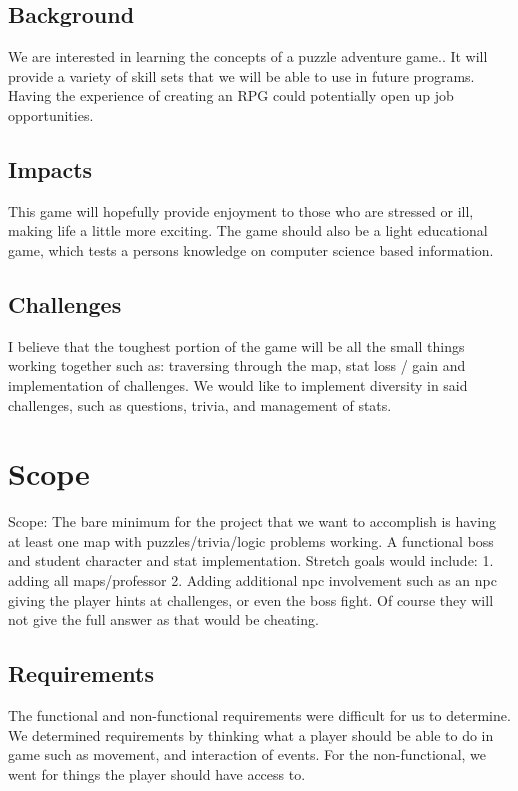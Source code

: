 \documentclass[10pt,conference,onecolumn,compsoc]{IEEEtran}
\begin{document}
\subsection{Background}
We are interested in learning the concepts of a puzzle adventure game.. It will provide a variety of skill sets that we will be able to use in future programs. Having the experience of creating an RPG could potentially open up job opportunities.



\subsection{Impacts}
This game will hopefully provide enjoyment to those who are stressed or ill, making life a little more exciting. The game should also be a light educational game, which tests a persons knowledge on computer science based information.

\subsection{Challenges}
I believe that the toughest portion of the game will be all the small things working together such as: traversing through the map, stat loss / gain and implementation of challenges. We would like to implement diversity in said challenges, such as questions, trivia, and management of stats.


\section{Scope}
Scope: The bare minimum for the project that we want to accomplish is having at least one map with puzzles/trivia/logic problems working. A functional boss and student character and stat implementation. 
Stretch goals would include: 1. adding all maps/professor 2. Adding additional npc involvement such as an npc giving the player hints at challenges, or even the boss fight. Of course they will not give the full answer as that would be cheating.

\subsection{Requirements}
The functional and non-functional requirements were difficult for us to determine. We determined requirements by thinking what a player should be able to do in game such as movement, and interaction of events. For the non-functional, we went for things the player should have access to.
\end{document}
